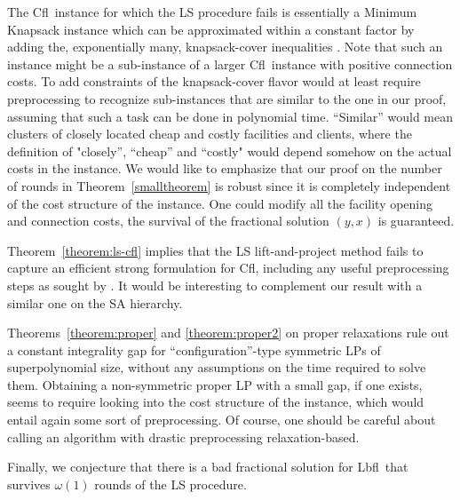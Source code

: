 \documentclass[11pt]{article}\usepackage{amsmath}
\newcommand{\lbfl}{{\sc Lbfl}}
\newcommand{\cfl}{{\sc Cfl}}
\begin{document}
The \cfl\ instance for which  the LS procedure fails is essentially a
 Minimum Knapsack instance which can be approximated within a constant
 factor by adding the, exponentially many, knapsack-cover inequalities
 \cite{CarrFLP00}. Note that such  an instance might be a sub-instance
 of a  larger \cfl\ instance  with positive connection costs.   To add
 constraints  of  the knapsack-cover  flavor  would  at least  require
 preprocessing to recognize sub-instances  that are similar to the one
 in our  proof, assuming that  such a task  can be done  in polynomial
 time.  ``Similar''  would mean clusters of closely  located cheap and
 costly facilities  and clients,  where the definition  of "closely'',
 ``cheap'' and ``costly"  would depend somehow on the  actual costs in
 the instance. We would like to emphasize that our proof on the number
 of  rounds  in  Theorem~\ref{smalltheorem}  is  robust  since  it  is
 completely  independent of the  cost structure  of the  instance. One
 could modify all the facility opening and connection costs,
the survival  of the
  fractional solution $(y,x)$ is guaranteed.


 Theorem~\ref{theorem:ls-cfl} implies that the LS lift-and-project method
 fails to capture an efficient strong formulation for \cfl, 
including any useful preprocessing steps as sought by \cite{AnBS13}. 
It would be interesting to complement our  result with a similar one
on the SA hierarchy.

\iffalse ---------------- Ruling out exponential-sized LPs that can be
solved efficiently  or can be  used for analysis without  solving them
(e.g.,  through the  primal-dual method)  is a  much  more challenging
task.  Towards that direction ---- \fi 

Theorems~\ref{theorem:proper}
and \ref{theorem:proper2} on proper relaxations rule out a constant
integrality gap for ``configuration''-type symmetric LPs of
superpolynomial size, without any  assumptions on the time required to
solve them.  Obtaining a non-symmetric proper LP with a small
gap, if one  exists, seems to require looking  into the cost structure
of the instance, which would entail again some sort of preprocessing.
Of course, one should be careful about calling an algorithm with 
 drastic preprocessing    relaxation-based. 


Finally, we conjecture that there is a bad fractional solution for
\lbfl\  that  survives $\omega(1)$  rounds  of  the  LS
procedure.
\end{document}
